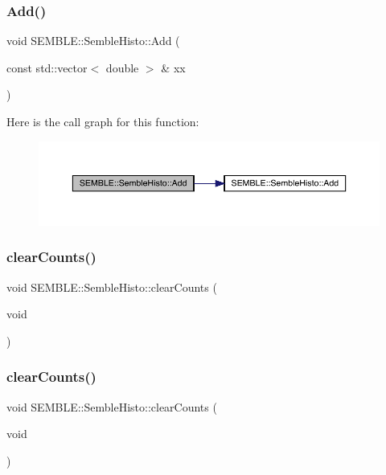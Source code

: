 \subsubsection{\texorpdfstring{Add()}{Add()}\hspace{0.1cm}{\footnotesize\ttfamily [4/4]}}
{\footnotesize\ttfamily void S\+E\+M\+B\+L\+E\+::\+Semble\+Histo\+::\+Add (\begin{DoxyParamCaption}\item[{const std\+::vector$<$ double $>$ \&}]{xx }\end{DoxyParamCaption})}

Here is the call graph for this function\+:
\nopagebreak
\begin{figure}[H]
\begin{center}
\leavevmode
\includegraphics[width=350pt]{d9/d05/structSEMBLE_1_1SembleHisto_a98b100d47d96f0f164165367b6b97d7a_cgraph}
\end{center}
\end{figure}
\mbox{\label{structSEMBLE_1_1SembleHisto_aeadf6a191dd07c0cd8ff12f01aed7839}} 
\subsubsection{\texorpdfstring{clearCounts()}{clearCounts()}\hspace{0.1cm}{\footnotesize\ttfamily [1/2]}}
{\footnotesize\ttfamily void S\+E\+M\+B\+L\+E\+::\+Semble\+Histo\+::clear\+Counts (\begin{DoxyParamCaption}\item[{void}]{ }\end{DoxyParamCaption})}

\mbox{\label{structSEMBLE_1_1SembleHisto_aeadf6a191dd07c0cd8ff12f01aed7839}} 
\subsubsection{\texorpdfstring{clearCounts()}{clearCounts()}\hspace{0.1cm}{\footnotesize\ttfamily [2/2]}}
{\footnotesize\ttfamily void S\+E\+M\+B\+L\+E\+::\+Semble\+Histo\+::clear\+Counts (\begin{DoxyParamCaption}\item[{void}]{ }\end{DoxyParamCaption})}

